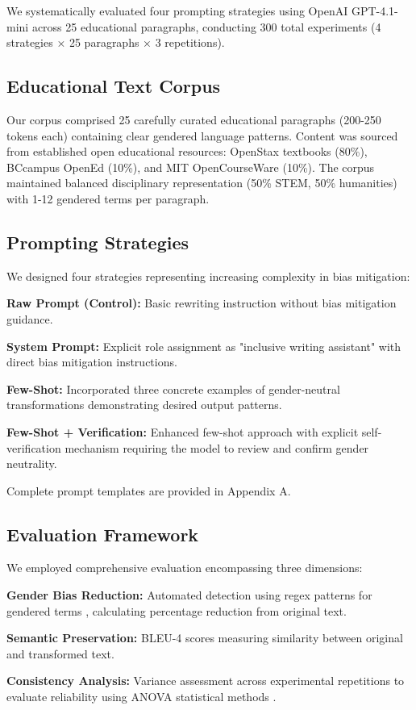 We systematically evaluated four prompting strategies using OpenAI GPT-4.1-mini across 25 educational paragraphs, conducting 300 total experiments (4 strategies × 25 paragraphs × 3 repetitions).

\subsection{Educational Text Corpus}
Our corpus comprised 25 carefully curated educational paragraphs (200-250 tokens each) containing clear gendered language patterns. Content was sourced from established open educational resources: OpenStax textbooks \cite{openstax2021subjects} (80\%), BCcampus OpenEd (10\%), and MIT OpenCourseWare (10\%). The corpus maintained balanced disciplinary representation (50\% STEM, 50\% humanities) with 1-12 gendered terms per paragraph.

\subsection{Prompting Strategies}
We designed four strategies representing increasing complexity in bias mitigation:

\textbf{Raw Prompt (Control):} Basic rewriting instruction without bias mitigation guidance.

\textbf{System Prompt:} Explicit role assignment as "inclusive writing assistant" with direct bias mitigation instructions.

\textbf{Few-Shot:} Incorporated three concrete examples of gender-neutral transformations demonstrating desired output patterns.

\textbf{Few-Shot + Verification:} Enhanced few-shot approach with explicit self-verification mechanism requiring the model to review and confirm gender neutrality.

Complete prompt templates are provided in Appendix A.

\subsection{Evaluation Framework}
We employed comprehensive evaluation encompassing three dimensions:

\textbf{Gender Bias Reduction:} Automated detection using regex patterns for gendered terms \cite{ningrum2020developing}, calculating percentage reduction from original text.

\textbf{Semantic Preservation:} BLEU-4 scores measuring similarity between original and transformed text.

\textbf{Consistency Analysis:} Variance assessment across experimental repetitions to evaluate reliability using ANOVA statistical methods \cite{dror2018anova}. 
